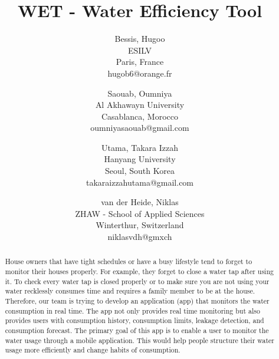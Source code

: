 \documentclass[10pt]{article}
\title{WET - Water Efficiency Tool }
\author{
  Bessis, Hugoo\\
  ESILV\\
  Paris, France\\
  hugob6@orange.fr
  \and
  Saouab, Oumniya\\
  Al Akhawayn University\\
  Casablanca, Morocco\\
  oumniyasaouab@gmail.com
  \and
  Utama, Takara Izzah\\
  Hanyang University\\
  Seoul, South Korea\\
  takaraizzahutama@gmail.com
  \and
  van der Heide, Niklas\\
  ZHAW - School of Applied Sciences\\
  Winterthur, Switzerland\\
  niklasvdh@gmxch
}
\begin{document}
\maketitle

\begin{abstract}
House owners that have tight schedules or have a busy lifestyle tend to forget to monitor their houses properly. For example, they forget to close a water tap after using it. To check every water tap is closed properly or to make sure you are not using your water recklessly consumes time and requires a family member to be at the house. Therefore, our team is trying to develop an application (app) that monitors the water consumption in real time. The app not only provides real time monitoring but also provides users with consumption history, consumption limits, leakage detection, and consumption forecast. The primary goal of this app is to enable a user to monitor the water usage through a mobile application. This would help people structure their water usage more efficiently and change habits of consumption.
\end{abstract}

\clearpage
\end{document}

